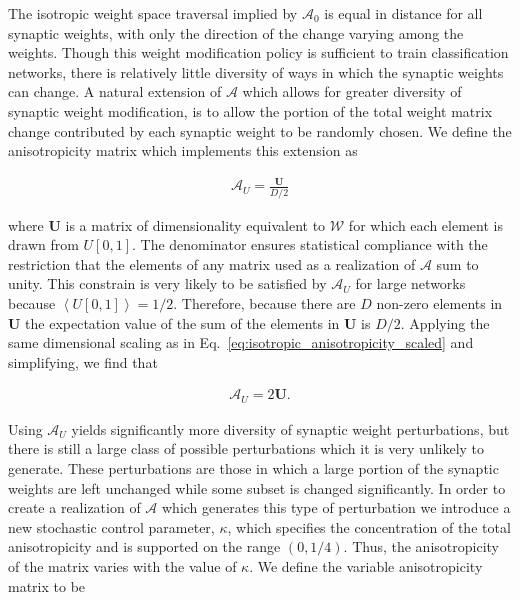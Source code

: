 \documentclass[10pt,journal,cspaper,compsoc]{IEEEtran}
\begin{document}
The isotropic weight space traversal implied by $\boldsymbol{\mathcal{A}}_0$ is equal in distance for all synaptic weights, with only the direction of the change varying among the weights. Though this weight modification policy is sufficient to train classification networks, there is relatively little diversity of ways in which the synaptic weights can change. A natural extension of $\boldsymbol{\mathcal{A}}$ which allows for greater diversity of synaptic weight modification, is to allow the portion of the total weight matrix change contributed by each synaptic weight to be randomly chosen. We define the anisotropicity matrix which implements this extension as

\begin{align}
	\boldsymbol{\mathcal{A}}_U =  \frac{\boldsymbol{U}}{D/2}
\end{align}

\noindent where $\boldsymbol{U}$ is a matrix of dimensionality equivalent to $\boldsymbol{\mathcal{W}}$ for which each element is drawn from $U[0,1]$.  The denominator ensures statistical compliance with the restriction that the elements of any matrix used as a realization of $\boldsymbol{\mathcal{A}}$ sum to unity. This constrain is very likely to be satisfied by $\boldsymbol{\mathcal{A}}_U$ for large networks because $\left\langle  U[0,1] \right\rangle =1/2$. Therefore, because there are $D$ non-zero elements in $\boldsymbol{U}$ the expectation value of the sum of the elements in $\boldsymbol{U}$ is $D/2$. Applying the same dimensional scaling as in Eq.~\ref{eq:isotropic_anisotropicity_scaled} and simplifying, we find that

\begin{align}
\boldsymbol{\mathcal{A}}_U =  2 \boldsymbol{U}.
\label{eq:uniform_anisotropicity}
\end{align}

Using $\boldsymbol{\mathcal{A}}_U$ yields significantly more diversity of synaptic weight perturbations, but there is still a large class of possible perturbations which it is very unlikely to generate. These perturbations are those in which a large portion of the synaptic weights are left unchanged while some subset is changed significantly. In order to create a realization of $\boldsymbol{\mathcal{A}}$ which generates this type of perturbation we introduce a new stochastic control parameter, $\kappa$, which specifies the concentration of the total anisotropicity and is supported on the range $(0, 1/4)$. Thus, the anisotropicity of the matrix varies with the value of  $\kappa$. We define the variable anisotropicity matrix to be
\end{document}
